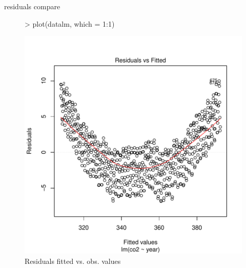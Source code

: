 \documentclass[11pt, a4paper]{article} %
\begin{document}
\linebreak
residuals compare\\
\begin{figure}[H]
\centering
\begin{Schunk}
\begin{Sinput}
> plot(datalm, which = 1:1)
\end{Sinput}
\end{Schunk}
\includegraphics{alleselena-042}
\caption{Residuals fitted vs. obs. values}
\label{comparison_finalgls1}
\end{figure}
\end{document}
